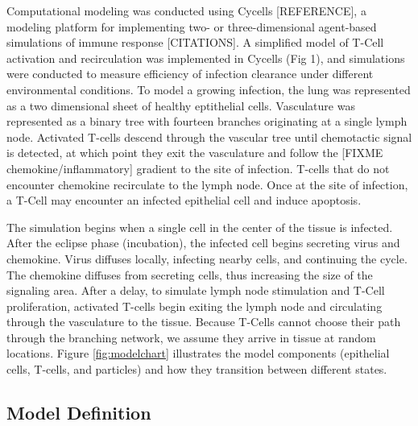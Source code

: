 \documentclass[10pt]{article}
\begin{document}
Computational modeling was conducted using Cycells [REFERENCE], a modeling platform for implementing two- or three-dimensional agent-based simulations of immune response [CITATIONS].
%
A simplified model of T-Cell activation and recirculation was implemented in Cycells (Fig 1), and simulations were conducted to measure efficiency of infection clearance under different environmental conditions. To model a growing infection, the lung was represented as a two dimensional sheet of healthy eptithelial cells. Vasculature was represented as a binary tree with fourteen branches originating at a single lymph node. Activated T-cells descend through the vascular tree until chemotactic signal is detected, at which point they exit the vasculature and follow the [FIXME chemokine/inflammatory] gradient to the site of infection. T-cells that do not encounter chemokine recirculate to the lymph node. Once at the site of infection, a T-Cell may encounter an infected epithelial cell and induce apoptosis.

The simulation begins when a single cell in the center of the tissue is infected. After the eclipse phase (incubation), the infected cell begins secreting virus and chemokine. Virus diffuses locally, infecting nearby cells, and continuing the cycle. The chemokine diffuses from secreting cells, thus increasing the size of the signaling area. After a delay, to simulate lymph node stimulation and T-Cell proliferation, activated T-cells begin exiting the lymph node and circulating through the vasculature to the tissue. Because T-Cells cannot choose their path through the branching network, we assume they arrive in tissue at random locations. Figure \ref{fig:modelchart} illustrates the model components 
(epithelial cells, T-cells, and particles) and how they transition between different states.

\subsection*{Model Definition}
\end{document}
